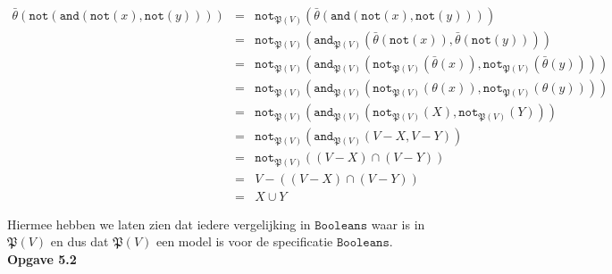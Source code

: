 \documentclass[a4paper,11pt]{article}
\begin{document}
\begin{itemize}
\begin{eqnarray*}
\bar \theta(\texttt{not}(\texttt{and}(\texttt{not}(x), \texttt{not}(y))))
      & = & \texttt{not}_{\mathfrak{P}(V)}(\bar \theta(\texttt{and}(\texttt{not}(x), \texttt{not}(y)))) \\
      & = & \texttt{not}_{\mathfrak{P}(V)}(\texttt{and}_{\mathfrak{P}(V)}(\bar \theta(\texttt{not}(x)), \bar \theta(\texttt{not}(y)))) \\
      & = & \texttt{not}_{\mathfrak{P}(V)}(\texttt{and}_{\mathfrak{P}(V)}(\texttt{not}_{\mathfrak{P}(V)}(\bar \theta(x)), \texttt{not}_{\mathfrak{P}(V)}(\bar \theta(y)))) \\
      & = & \texttt{not}_{\mathfrak{P}(V)}(\texttt{and}_{\mathfrak{P}(V)}(\texttt{not}_{\mathfrak{P}(V)}(\theta(x)), \texttt{not}_{\mathfrak{P}(V)}(\theta(y)))) \\
      & = & \texttt{not}_{\mathfrak{P}(V)}(\texttt{and}_{\mathfrak{P}(V)}(\texttt{not}_{\mathfrak{P}(V)}(X), \texttt{not}_{\mathfrak{P}(V)}(Y))) \\
      & = & \texttt{not}_{\mathfrak{P}(V)}(\texttt{and}_{\mathfrak{P}(V)}(V - X, V - Y)) \\
      & = & \texttt{not}_{\mathfrak{P}(V)}((V - X) \cap (V - Y)) \\
      & = & V - ((V - X) \cap (V - Y)) \\
      & = & X \cup Y
\end{eqnarray*}

\end{itemize}

Hiermee hebben we laten zien dat iedere vergelijking in $\texttt{Booleans}$
waar is in $\mathfrak{P}(V)$ en dus dat $\mathfrak{P}(V)$ een model is voor de
specificatie $\texttt{Booleans}$.\\[2em]


{\bf Opgave 5.2}
\end{document}
